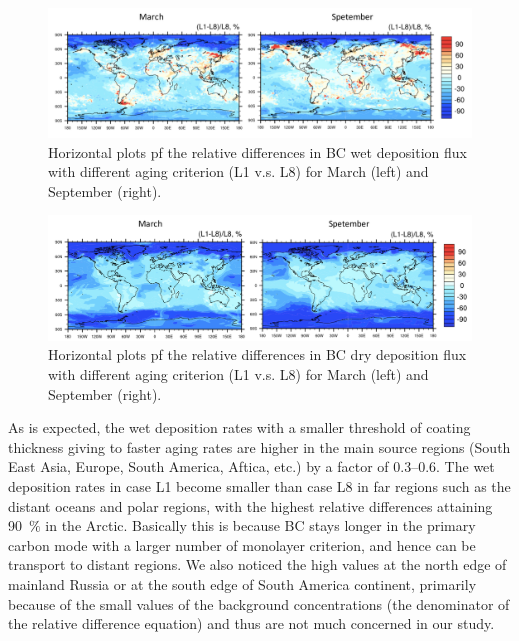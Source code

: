 \documentclass[12pt]{article}
\begin{document}
		\begin{figure}[h] 
			\begin{center}
				\includegraphics[width = 1\textwidth]{Figure17}
				\caption[]{\label{fig_P17} Horizontal plots pf the relative differences in BC wet deposition flux with different aging criterion (L1 v.s. L8) for March (left) and September (right).}
			\end{center}
		\end{figure}
		
		
		\begin{figure}[h] 
			\begin{center}
				\includegraphics[width = 1\textwidth]{Figure18}
				\caption[]{\label{fig_P18} Horizontal plots pf the relative differences in BC dry deposition flux with different aging criterion (L1 v.s. L8) for March (left) and September (right).}
			\end{center}
		\end{figure}
	
	As is expected, the wet deposition rates with a smaller threshold of coating thickness giving to faster aging rates are higher in the main source regions (South East Asia, Europe, South America, Aftica, etc.) by a factor of 0.3--0.6. The wet deposition rates in case L1 become smaller than case L8 in far regions such as the distant oceans and polar regions, with the highest relative differences attaining 90~$\%$ in the Arctic. Basically this is because BC stays longer in the primary carbon mode with a larger number of monolayer criterion, and hence can be transport to distant regions. We also noticed the high values at the north edge of mainland Russia or at the south edge of South America continent, primarily because of the small values of the background concentrations (the denominator of the relative difference equation) and thus are not much concerned in our study.
	
\end{document}
